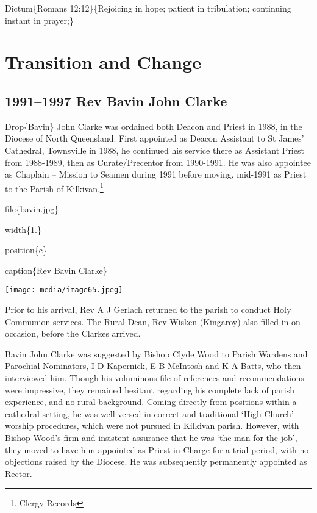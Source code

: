 Dictum\{Romans 12:12\}\{Rejoicing in hope; patient in tribulation; continuing instant in prayer;\}

\hypertarget{transition-and-change}{%
\chapter{Transition and Change}\label{transition-and-change}}

\hypertarget{rev-bavin-john-clarke}{%
\section{1991--1997 Rev Bavin John Clarke}\label{rev-bavin-john-clarke}}

Drop\{Bavin\} John Clarke was ordained both Deacon and Priest in 1988, in the Diocese of North Queensland. First appointed as Deacon Assistant to St James' Cathedral, Townsville in 1988, he continued his service there as Assistant Priest from 1988-1989, then as Curate/Precentor from 1990-1991. He was also appointee as Chaplain -- Mission to Seamen during 1991 before moving, mid-1991 as Priest to the Parish of Kilkivan.\footnote{Clergy Records}

file\{bavin.jpg\}

width\{1.\}

position\{c\}

caption\{Rev Bavin Clarke\}

\texttt{[image: media/image65.jpeg]}

Prior to his arrival, Rev A J Gerlach returned to the parish to conduct Holy Communion services. The Rural Dean, Rev Wisken (Kingaroy) also filled in on occasion, before the Clarkes arrived.

Bavin John Clarke was suggested by Bishop Clyde Wood to Parish Wardens and Parochial Nominators, I D Kapernick, E B McIntosh and K A Batts, who then interviewed him. Though his voluminous file of references and recommendations were impressive, they remained hesitant regarding his complete lack of parish experience, and no rural background. Coming directly from positions within a cathedral setting, he was well versed in correct and traditional `High Church' worship procedures, which were not pursued in Kilkivan parish. However, with Bishop Wood's firm and insistent assurance that he was `the man for the job', they moved to have him appointed as Priest-in-Charge for a trial period, with no objections raised by the Diocese. He was subsequently permanently appointed as Rector.


